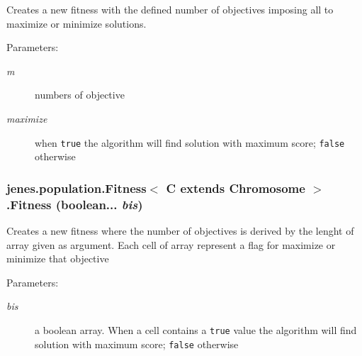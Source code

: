 Creates a new fitness with the defined number of objectives imposing all to maximize or minimize solutions.

\begin{Desc}
\item[Parameters:]
\begin{description}
\item[{\em m}]numbers of objective \item[{\em maximize}]when {\tt true} the algorithm will find solution with maximum score; {\tt false} otherwise \end{description}
\end{Desc}
\hypertarget{classjenes_1_1population_1_1_fitness_3_01_c_01extends_01_chromosome_01_4_57836e06b6476c09409f771be28dad74}{
\subsubsection[Fitness]{\setlength{\rightskip}{0pt plus 5cm}jenes.population.Fitness$<$ C extends Chromosome $>$.Fitness (boolean... {\em bis})}}
\label{classjenes_1_1population_1_1_fitness_3_01_c_01extends_01_chromosome_01_4_57836e06b6476c09409f771be28dad74}


Creates a new fitness where the number of objectives is derived by the lenght of array given as argument. Each cell of array represent a flag for maximize or minimize that objective

\begin{Desc}
\item[Parameters:]
\begin{description}
\item[{\em bis}]a boolean array. When a cell contains a {\tt true} value the algorithm will find solution with maximum score; {\tt false} otherwise \end{description}
\end{Desc}


